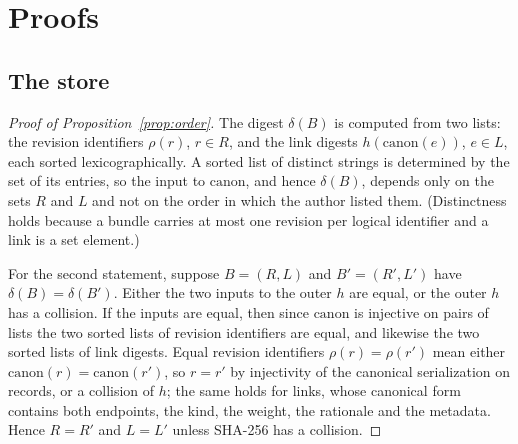 \section{Proofs}\label{app:proofs}

\subsection{The store}

\begin{proof}[Proof of Proposition~\ref{prop:order}]\label{proof:prop:order}
The digest $\delta(B)$ is computed from two lists: the revision identifiers $\rho(r)$, $r\in R$, and the link digests $h(\mathrm{canon}(e))$, $e\in L$, each sorted lexicographically. A sorted list of distinct strings is determined by the set of its entries, so the input to $\mathrm{canon}$, and hence $\delta(B)$, depends only on the sets $R$ and $L$ and not on the order in which the author listed them. (Distinctness holds because a bundle carries at most one revision per logical identifier and a link is a set element.)

For the second statement, suppose $B=(R,L)$ and $B'=(R',L')$ have $\delta(B)=\delta(B')$. Either the two inputs to the outer $h$ are equal, or the outer $h$ has a collision. If the inputs are equal, then since $\mathrm{canon}$ is injective on pairs of lists the two sorted lists of revision identifiers are equal, and likewise the two sorted lists of link digests. Equal revision identifiers $\rho(r)=\rho(r')$ mean either $\mathrm{canon}(r)=\mathrm{canon}(r')$, so $r=r'$ by injectivity of the canonical serialization on records, or a collision of $h$; the same holds for links, whose canonical form contains both endpoints, the kind, the weight, the rationale and the metadata. Hence $R=R'$ and $L=L'$ unless SHA-256 has a collision.
\end{proof}

